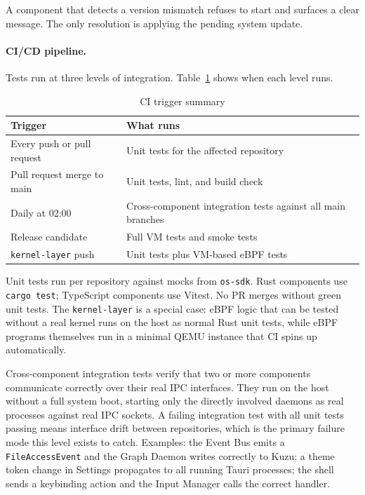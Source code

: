 A component that detects a version mismatch refuses to start and surfaces a
clear message. The only resolution is applying the pending system update.

\paragraph{CI/CD pipeline.}
Tests run at three levels of integration. Table~\ref{tab:ci-triggers} shows
when each level runs.

\begin{table}[htbp]
\caption{CI trigger summary}
\label{tab:ci-triggers}
\begin{tabularx}{\linewidth}{lX}
\toprule
\textbf{Trigger} & \textbf{What runs} \\
\midrule
Every push or pull request     & Unit tests for the affected repository \\
Pull request merge to main     & Unit tests, lint, and build check \\
Daily at 02:00                 & Cross-component integration tests against all main branches \\
Release candidate              & Full VM tests and smoke tests \\
\texttt{kernel-layer} push     & Unit tests plus VM-based eBPF tests \\
\bottomrule
\end{tabularx}
\end{table}

Unit tests run per repository against mocks from \texttt{os-sdk}. Rust
components use \texttt{cargo test}; TypeScript components use Vitest. No PR
merges without green unit tests. The \texttt{kernel-layer} is a special case:
eBPF logic that can be tested without a real kernel runs on the host as normal
Rust unit tests, while eBPF programs themselves run in a minimal QEMU instance
that CI spins up automatically.

Cross-component integration tests verify that two or more components
communicate correctly over their real IPC interfaces. They run on the host
without a full system boot, starting only the directly involved daemons as real
processes against real IPC sockets. A failing integration test with all unit
tests passing means interface drift between repositories, which is the primary
failure mode this level exists to catch. Examples: the Event Bus emits a
\texttt{FileAccessEvent} and the Graph Daemon writes correctly to Kuzu; a theme
token change in Settings propagates to all running Tauri processes; the shell
sends a keybinding action and the Input Manager calls the correct handler.

